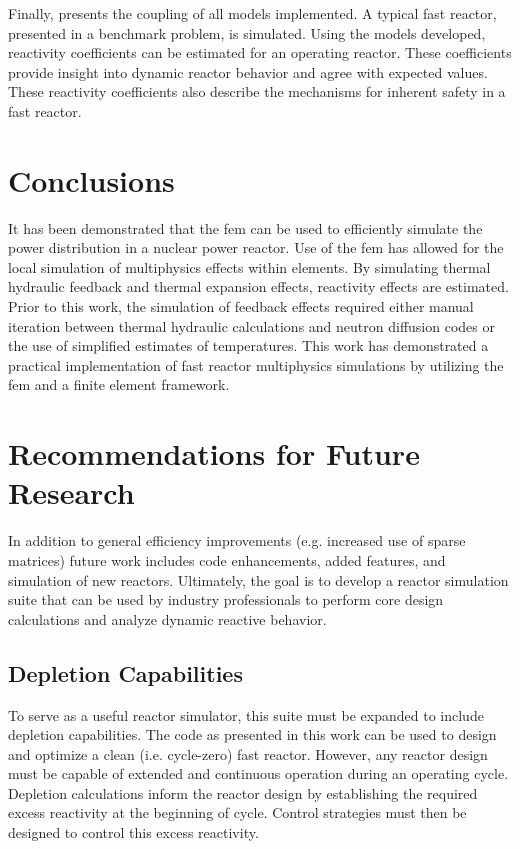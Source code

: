   Finally,  presents the coupling of all models
  implemented. A typical fast reactor, presented in a benchmark problem, is 
  simulated. Using the models developed, reactivity coefficients can be 
  estimated for an operating reactor. These coefficients provide insight into 
  dynamic reactor behavior and agree with expected values. These reactivity 
  coefficients also describe the mechanisms for inherent safety in a fast 
  reactor.

\section{Conclusions}
  
  It has been demonstrated that the \gls{fem} can be used to efficiently 
  simulate the power distribution in a nuclear power reactor. Use of the
  \gls{fem} has allowed for the local simulation of multiphysics effects within 
  elements. By simulating thermal hydraulic feedback and thermal expansion 
  effects, reactivity effects are estimated. Prior to this work, the 
  simulation of feedback effects required either manual iteration between 
  thermal hydraulic calculations and neutron diffusion codes or the use of 
  simplified estimates of temperatures. This work has demonstrated a practical
  implementation of fast reactor multiphysics simulations by utilizing the
  \gls{fem} and a finite element framework.
  
\section{Recommendations for Future Research}

  In addition to general efficiency improvements (e.g. increased use of sparse
  matrices) future work includes code enhancements, added features, and 
  simulation of new reactors. Ultimately, the goal is to develop a reactor 
  simulation suite that can be used by industry professionals to perform core 
  design calculations and analyze dynamic reactive behavior. 

  \subsection{Depletion Capabilities}
    To serve as a useful reactor simulator, this suite must be expanded to 
    include depletion capabilities. The code as presented in this work can be 
    used to design and optimize a clean (i.e. cycle-zero) fast reactor. However,
    any reactor design must be capable of extended and continuous operation
    during an operating cycle. Depletion calculations inform the reactor design
    by establishing the required excess reactivity at the beginning of cycle.
    Control strategies must then be designed to control this excess reactivity. 

